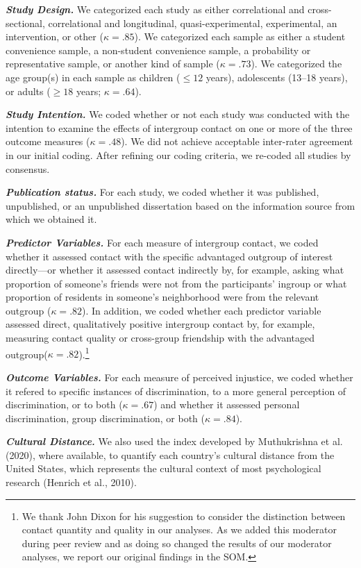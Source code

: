 \documentclass[12pt, letterpaper]{article}
\begin{document}
\textbf{\emph{Study Design.}} We categorized each study as either
correlational and cross-sectional, correlational and longitudinal,
quasi-experimental, experimental, an intervention, or other
(\(\kappa = .85\)). We categorized each sample as either a student
convenience sample, a non-student convenience sample, a probability or
representative sample, or another kind of sample (\(\kappa = .73\)). We
categorized the age group(s) in each sample as children (\(\leq 12\)
years), adolescents (13--18 years), or adults (\(\geq 18\) years;
\(\kappa = .64\)).

\textbf{\emph{Study Intention.}} We coded whether or not each study was
conducted with the intention to examine the effects of intergroup
contact on one or more of the three outcome measures (\(\kappa = .48\)).
We did not achieve acceptable inter-rater agreement in our initial
coding. After refining our coding criteria, we re-coded all studies by
consensus.

\textbf{\emph{Publication status.}} For each study, we coded whether it
was published, unpublished, or an unpublished dissertation based on the
information source from which we obtained it.

\textbf{\emph{Predictor Variables.}} For each measure of intergroup
contact, we coded whether it assessed contact with the specific
advantaged outgroup of interest directly---or whether it assessed
contact indirectly by, for example, asking what proportion of someone's
friends were not from the participants' ingroup or what proportion of
residents in someone's neighborhood were from the relevant outgroup
(\(\kappa = .82\)). In addition, we coded whether each predictor
variable assessed direct, qualitatively positive intergroup contact by,
for example, measuring contact quality or cross-group friendship with
the advantaged outgroup(\(\kappa = .82\)).\footnote{We thank John Dixon
  for his suggestion to consider the distinction between contact
  quantity and quality in our analyses. As we added this moderator
  during peer review and as doing so changed the results of our
  moderator analyses, we report our original findings in the SOM.}

\textbf{\emph{Outcome Variables.}} For each measure of perceived
injustice, we coded whether it refered to specific instances of
discrimination, to a more general perception of discrimination, or to
both (\(\kappa = .67\)) and whether it assessed personal discrimination,
group discrimination, or both (\(\kappa = .84\)).

\textbf{\emph{Cultural Distance.}} We also used the index developed by
Muthukrishna et al. (2020), where available, to quantify each country's
cultural distance from the United States, which represents the cultural
context of most psychological research (Henrich et al., 2010).
\end{document}
